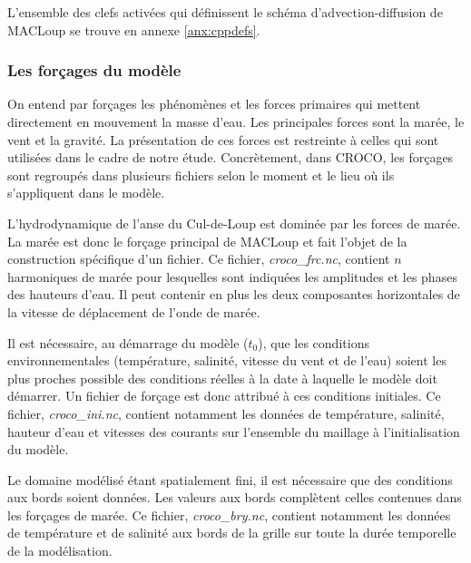 \documentclass[10pt,a4paper,titlepage]{article}
\begin{document}
L'ensemble des clefs activées qui définissent le schéma d'advection-diffusion de MACLoup se trouve en annexe \ref{anx:cppdefs}.


\subsubsection{Les forçages du modèle}
\label{subsub:forcages}
On entend par forçages les phénomènes et les forces primaires qui mettent directement en mouvement la masse d'eau.
Les principales forces sont la marée, le vent et la gravité.
La présentation de ces forces est restreinte à celles qui sont utilisées dans le cadre de notre étude.
Concrètement, dans CROCO, les forçages sont regroupés dans plusieurs fichiers selon le moment et le lieu où ils s'appliquent dans le modèle.

L'hydrodynamique de l'anse du Cul-de-Loup est dominée par les forces de marée.
La marée est donc le forçage principal de MACLoup et fait l'objet de la construction spécifique d'un fichier.
Ce fichier, \textit{croco\_frc.nc}, contient $n$ harmoniques de marée pour lesquelles sont indiquées les amplitudes et les phases des hauteurs d'eau. Il peut contenir en plus les deux composantes horizontales de la vitesse de déplacement de l'onde de marée.

Il est nécessaire, au démarrage du modèle ($t_0$), que les conditions environnementales (température, salinité, vitesse du vent et de l'eau) soient les plus proches possible des conditions réelles à la date à laquelle le modèle doit démarrer.
Un fichier de forçage est donc attribué à ces conditions initiales.
Ce fichier, \textit{croco\_ini.nc}, contient notamment les données de température, salinité, hauteur d'eau et vitesses des courants sur l'ensemble du maillage à l'initialisation du modèle.

Le domaine modélisé étant spatialement fini, il est nécessaire que des conditions aux bords soient données.
Les valeurs aux bords complètent celles contenues dans les forçages de marée.
Ce fichier, \textit{croco\_bry.nc}, contient notamment les données de température et de salinité %
aux bords de la grille sur toute la durée temporelle de la modélisation.
\end{document}
